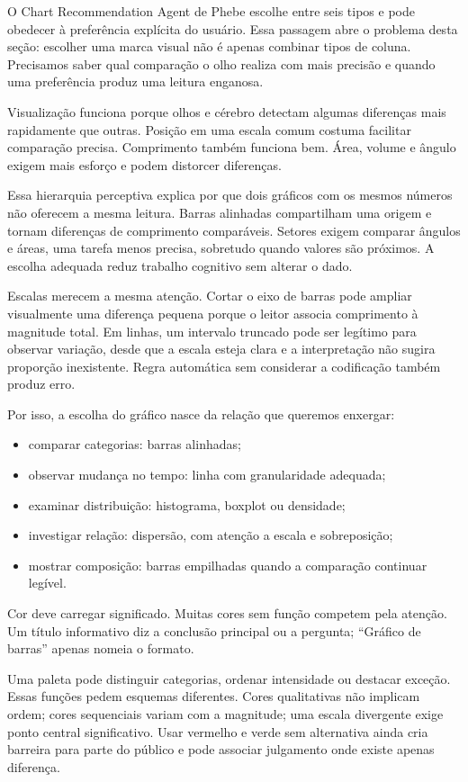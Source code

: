 O Chart Recommendation Agent de Phebe escolhe entre seis tipos e pode obedecer à preferência explícita do usuário. Essa passagem abre o problema desta seção: escolher uma marca visual não é apenas combinar tipos de coluna. Precisamos saber qual comparação o olho realiza com mais precisão e quando uma preferência produz uma leitura enganosa.

Visualização funciona porque olhos e cérebro detectam algumas diferenças mais rapidamente que outras. Posição em uma escala comum costuma facilitar comparação precisa. Comprimento também funciona bem. Área, volume e ângulo exigem mais esforço e podem distorcer diferenças.

Essa hierarquia perceptiva explica por que dois gráficos com os mesmos números não oferecem a mesma leitura. Barras alinhadas compartilham uma origem e tornam diferenças de comprimento comparáveis. Setores exigem comparar ângulos e áreas, uma tarefa menos precisa, sobretudo quando valores são próximos. A escolha adequada reduz trabalho cognitivo sem alterar o dado.

Escalas merecem a mesma atenção. Cortar o eixo de barras pode ampliar visualmente uma diferença pequena porque o leitor associa comprimento à magnitude total. Em linhas, um intervalo truncado pode ser legítimo para observar variação, desde que a escala esteja clara e a interpretação não sugira proporção inexistente. Regra automática sem considerar a codificação também produz erro.

Por isso, a escolha do gráfico nasce da relação que queremos enxergar:

\begin{itemize}[leftmargin=*]
  \item comparar categorias: barras alinhadas;
  \item observar mudança no tempo: linha com granularidade adequada;
  \item examinar distribuição: histograma, boxplot ou densidade;
  \item investigar relação: dispersão, com atenção a escala e sobreposição;
  \item mostrar composição: barras empilhadas quando a comparação continuar legível.
\end{itemize}

Cor deve carregar significado. Muitas cores sem função competem pela atenção. Um título informativo diz a conclusão principal ou a pergunta; ``Gráfico de barras'' apenas nomeia o formato.

Uma paleta pode distinguir categorias, ordenar intensidade ou destacar exceção. Essas funções pedem esquemas diferentes. Cores qualitativas não implicam ordem; cores sequenciais variam com a magnitude; uma escala divergente exige ponto central significativo. Usar vermelho e verde sem alternativa ainda cria barreira para parte do público e pode associar julgamento onde existe apenas diferença.

